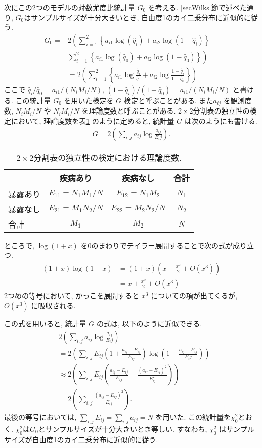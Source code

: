\documentclass{jarticle}
\begin{document}
次にこの2つのモデルの対数尤度比統計量 $G_0$ を考える.
\ref{secWilks}節で述べた通り, $G_0$はサンプルサイズが十分大きいとき, 自由度1のカイ二乗分布に近似的に従う. 
\begin{align}
G_0 =& 2 \left(\sum_{i=1}^2 \left\{ a_{i1}\log(\hat q_i)+ a_{i2}\log(1-\hat q_i)\right\} -\right. \\
&\left.\sum_{i=1}^2 \left\{ a_{i1}\log(\hat q_0) + a_{i2}\log(1-\hat q_0)\right\}\right)\\
&= 2 \left(\sum_{i=1}^2\left\{ a_{i1}\log\frac{\hat q_i}{\hat q_0} + a_{i2}\log\frac{1-\hat q_i}{1-\hat q_0}\right\}\right)
\end{align}
ここで $\hat q_i/\hat q_0 = a_{i1}/(N_iM_i/N)$,  $(1-\hat q_i)/(1-\hat q_0) = a_{i1}/(N_iM_i/N)$ と書ける.
この統計量 $G_0$ を用いた検定を $G$ 検定と呼ぶことがある.
また$a_{ij}$ を観測度数, $N_iM_i/N$ や $N_iM_i/N$ を理論度数と呼ぶことがある.
$2 \times 2$分割表の独立性の検定において, 理論度数を表\ref{2by2theo} のように定めると, 統計量 $G$ は次のようにも書ける.
\begin{align}
G = 2 \left(\sum_{i,j} a_{ij}\log\frac{a_{ij}}{E_ij} \right).
\end{align}
\begin{table}[htbp]
\centering
\caption{$2 \times 2$分割表の独立性の検定における理論度数.}
\label{2by2theo}
\begin{tabular}{l|cc|c}
 & 疾病あり&疾病なし&合計\\
 \hline
 暴露あり&$E_{11} = N_1M_1/N$&$E_{12} = N_1M_2$&$N_1$\\
 暴露なし&$E_{21} = M_1N_2/N $&$E_{22}=M_2N_2/N$&$N_2$\\
  \hline
 合計 & $M_1$ & $M_2$ & $N$
\end{tabular}
\end{table}

ところで, $\log (1+x)$ を0のまわりでテイラー展開することで次の式が成り立つ. 
\begin{align}
(1+x) \log (1+x) &= (1+x)\left(x-\frac{x^2}{2} + O(x^3)\right) \\
& = x + \frac{x^2}{2} +  O(x^3)
\end{align}
2つめの等号において, かっこを展開すると $x^3$ についての項が出てくるが, $O(x^3)$ に吸収される.

この式を用いると, 統計量 $G$ の式は, 以下のように近似できる.
\begin{align}
&2 \left(\sum_{i,j} a_{ij}\log\frac{a_{ij}}{E_ij} \right)\\
&=2 \left(\sum_{i,j} E_{ij} \left(1+ \frac{a_{ij}-E_{ij}}{E_{ij}}\right)\log\left(1+ \frac{a_{ij}-E_{ij}}{E_ij} \right)\right)\\
&\approx 2 \left(\sum_{i,j} E_{ij}\left(  \frac{a_{ij}-E_{ij}}{E_{ij}}- \frac{(a_{ij}-E_{ij})^2}{E_{ij}^2} \right)\right) \\
&= 2 \left(\sum_{i,j} \frac{(a_{ij}-E_{ij})^2}{E_{ij}} \right).
\end{align}
最後の等号においては, $\sum_{i,j} E_{ij} =\sum_{i,j} a_{ij} = N$ を用いた.
この統計量を$\chi^2_0$とおく. 
$\chi^2_0$は$G_0$とサンプルサイズが十分大きいとき等しい.
すなわち, $\chi^2_0$ はサンプルサイズが自由度1のカイ二乗分布に近似的に従う.
\end{document}

